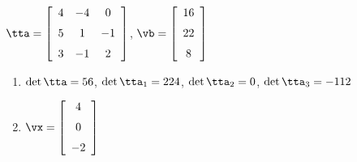 {$\tta = \left[ \begin {array}{ccc} 4&-4&0\\\noalign{\medskip}5&1&-1
\\\noalign{\medskip}3&-1&2\end {array} \right] $,
 \quad
$\vb = \left[ \begin {array}{c} 16\\\noalign{\medskip}22\\\noalign{\medskip}
8\end {array} \right] $}
{\begin{enumerate}
\item	$\det{\tta} = 56$, $\det{\tta_1} = 224$, $\det{\tta_2} = 0$, $\det{\tta_3} = -112$
\item $\vx = \left[ \begin {array}{c} 4\\\noalign{\medskip}0\\\noalign{\medskip}-2
\end {array} \right]$
\end{enumerate}
}


 

 

